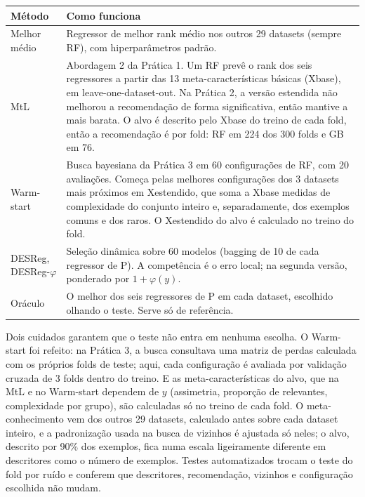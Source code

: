 \documentclass[10pt,a4paper]{article}
\begin{document}
\begin{center}\small
\begin{tabularx}{\linewidth}{lY}
\toprule
Método & Como funciona \\
\midrule
Melhor médio & Regressor de melhor rank médio nos outros 29 datasets (sempre RF), com hiperparâmetros padrão. \\
MtL & Abordagem 2 da Prática 1. Um RF prevê o rank dos seis regressores a partir das 13 meta-características básicas (Xbase), em leave-one-dataset-out. Na Prática 2, a versão estendida não melhorou a recomendação de forma significativa, então mantive a mais barata. O alvo é descrito pelo Xbase do treino de cada fold, então a recomendação é por fold: RF em 224 dos 300 folds e GB em 76. \\
Warm-start & Busca bayesiana da Prática 3 em 60 configurações de RF, com 20 avaliações. Começa pelas melhores configurações dos 3 datasets mais próximos em Xestendido, que soma a Xbase medidas de complexidade do conjunto inteiro e, separadamente, dos exemplos comuns e dos raros. O Xestendido do alvo é calculado no treino do fold. \\
DESReg, DESReg-$\varphi$ & Seleção dinâmica sobre 60 modelos (bagging de 10 de cada regressor de P). A competência é o erro local; na segunda versão, ponderado por $1+\varphi(y)$. \\
Oráculo & O melhor dos seis regressores de P em cada dataset, escolhido olhando o teste. Serve só de referência. \\
\bottomrule
\end{tabularx}
\end{center}

Dois cuidados garantem que o teste não entra em nenhuma escolha. O Warm-start foi refeito: na Prática 3, a busca consultava uma matriz de perdas calculada com os próprios folds de teste; aqui, cada configuração é avaliada por validação cruzada de 3 folds dentro do treino. E as meta-características do alvo, que na MtL e no Warm-start dependem de $y$ (assimetria, proporção de relevantes, complexidade por grupo), são calculadas só no treino de cada fold. O meta-conhecimento vem dos outros 29 datasets, calculado antes sobre cada dataset inteiro, e a padronização usada na busca de vizinhos é ajustada só neles; o alvo, descrito por 90\% dos exemplos, fica numa escala ligeiramente diferente em descritores como o número de exemplos. Testes automatizados trocam o teste do fold por ruído e conferem que descritores, recomendação, vizinhos e configuração escolhida não mudam.
\end{document}
